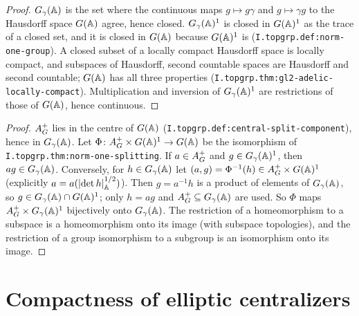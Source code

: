 \begin{theorem}[closedness]
\end{theorem}
\begin{proof}
$G_\gamma(\mathbb{A})$ is the set where the continuous maps $g\mapsto g\gamma$ and $g\mapsto\gamma g$ to the Hausdorff space $G(\mathbb{A})$ agree, hence
closed. $G_\gamma(\mathbb{A})^1$ is closed in $G(\mathbb{A})^1$ as the trace of a closed set, and it is closed in $G(\mathbb{A})$ because $G(\mathbb{A})^1$ is
(\texttt{I.topgrp.def:norm-one-group}). A closed subset of a locally compact Hausdorff space is locally compact, and
subspaces of Hausdorff, second countable spaces are Hausdorff and second countable; $G(\mathbb{A})$ has all three properties
(\texttt{I.topgrp.thm:gl2-adelic-locally-compact}). Multiplication and inversion of $G_\gamma(\mathbb{A})^1$ are restrictions of those of $G(\mathbb{A})$,
hence continuous.
\end{proof}

\begin{theorem}
\end{theorem}
\begin{proof}
$A_G^+$ lies in the centre of $G(\mathbb{A})$ (\texttt{I.topgrp.def:central-split-component}), hence in $G_\gamma(\mathbb{A})$. Let
$\Phi\colon A_G^+\times G(\mathbb{A})^1\to G(\mathbb{A})$ be the isomorphism of \texttt{I.topgrp.thm:norm-one-splitting}. If $a\in A_G^+$ and $g\in G_\gamma(\mathbb{A})^1$, then
$ag\in G_\gamma(\mathbb{A})$. Conversely, for $h\in G_\gamma(\mathbb{A})$ let $(a,g)=\Phi^{-1}(h)\in A_G^+\times G(\mathbb{A})^1$ (explicitly $a=a(\lvert\det h\rvert_{\mathbb{A}}^{1/2})$). Then $g=a^{-1}h$ is a
product of elements of $G_\gamma(\mathbb{A})$, so $g\in G_\gamma(\mathbb{A})\cap G(\mathbb{A})^1$; only $h=ag$ and $A_G^+\subseteq G_\gamma(\mathbb{A})$ are used. So $\Phi$ maps $A_G^+\times G_\gamma(\mathbb{A})^1$ bijectively onto $G_\gamma(\mathbb{A})$. The restriction of a
homeomorphism to a subspace is a homeomorphism onto its image (with subspace topologies), and the restriction of a group isomorphism to a
subgroup is an isomorphism onto its image.
\end{proof}

\section{Compactness of elliptic centralizers}\label{sec:orb-compact}

